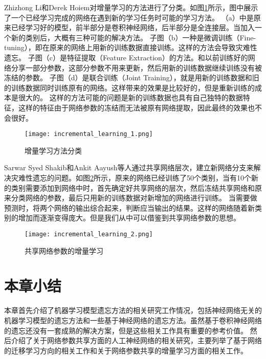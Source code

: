 Zhizhong Li和Derek Hoiem\cite{8107520}对增量学习的方法进行了分类。如图\ref{fig:incremental_learning_1}所示，图中展示了一个已经学习完成的网络在遇到新的学习任务时可能的学习方法。
（a）中是原来已经学习好的模型，前半部分是卷积神经网络，后半部分是全连接层。当加入一个新的类别后，大概有三种可能的解决方法。
子图（b）一种是微调训练（Fine-tuning），即在原来的网络上用新的训练数据直接训练。这样的方法会导致灾难性遗忘。
子图（c）是特征提取（Feature Extraction）的方法。和以前训练好的网络分享一部分参数，这部分参数不用来更新，然后用新的训练数据继续训练没有被冻结的参数。
子图（d）是联合训练（Joint Training），就是用新的训练数据和旧的训练数据同时训练原有的网络。这样带来的效果是比较好的，但是重新训练的成本是很大的。
这样的方法可能的问题是新的训练数据也具有自己独特的数据特征，这样的特征由于网络参数的冻结而无法被原有网络提取，因此最终的效果也不会很好。
\begin{figure}
    \centering
    \texttt{[image: incremental\_learning\_1.png]}
    \caption{增量学习方法分类}
    \label{fig:incremental_learning_1}
\end{figure}

Sarwar Syed Shakib和Ankit Aayush等人\cite{Sarwar_2020}通过共享网络层次，建立新网络分支来解决灾难性遗忘的问题。如图\ref{fig:incremental_learning_2}所示，原来的网络已经训练了50个类别，当有10个新的类别需要添加到网络中时，首先确定好共享网络的层次，然后冻结共享网络和原来分类网络的参数，最后只用新的训练数据对新增加的网络进行训练。
当需要做预测时，将两个网络的输出综合起来，判断应当输出的结果。这样的网络随着新类别的增加而逐渐变得庞大。但是我们从中可以借鉴到共享网络参数的思想。
\begin{figure}
    \centering
    \texttt{[image: incremental\_learning\_2.png]}
    \caption{共享网络参数的增量学习}
    \label{fig:incremental_learning_2}
\end{figure}


\section{本章小结}
本章首先介绍了机器学习模型遗忘方法的相关研究工作情况，包括神经网络无关的机器学习模型的遗忘方法和一些基于神经网络的遗忘方法。虽然基于卷积神经网络的遗忘还没有一套成熟的解决方案，但是这些相关工作具有重要的参考价值。
然后介绍了关于网络参数共享方面的人工神经网络的相关研究，主要列举了基于网络的迁移学习方向的相关工作和关于网络参数共享的增量学习方面的相关工作。